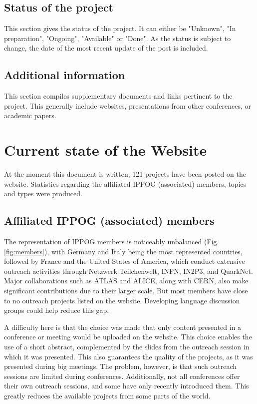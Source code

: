 \subsection*{Status of the project}
This section gives the status of the project. It can either be "Unknown", "In preparation", "Ongoing", "Available" or "Done". As the status is subject to change, the date of the most recent update of the post is included.

\subsection*{Additional information}
This section compiles supplementary documents and links pertinent to the project. This generally include websites, presentations from other conferences, or academic papers.

\newpage
\section{Current state of the Website}\label{ssec:state}

At the moment this document is written, 121 projects have been posted on the website. Statistics regarding the affiliated IPPOG (associated) members, topics and types were produced.

\subsection*{Affiliated IPPOG (associated) members}
The representation of IPPOG members is noticeably unbalanced (Fig. \ref{fig:members}), with Germany and Italy being the most represented countries, followed by France and the United States of America, which conduct extensive outreach activities through Netzwerk Teilchenwelt, INFN, IN2P3, and QuarkNet. Major collaborations such as ATLAS and ALICE, along with CERN, also make significant contributions due to their larger scale. But most members have close to no outreach projects listed on the website. Developing language discussion groups could help reduce this gap.

A difficulty here is that the choice was made that only content presented in a conference or meeting would be uploaded on the website. This choice enables the use of a short abstract, complemented by the slides from the outreach session in which it was presented. This also guarantees the quality of the projects, as it was presented during big meetings. The problem, however, is that such outreach sessions are limited during conferences. Additionally, not all conferences offer their own outreach sessions, and some have only recently introduced them. This greatly reduces the available projects from some parts of the world.

